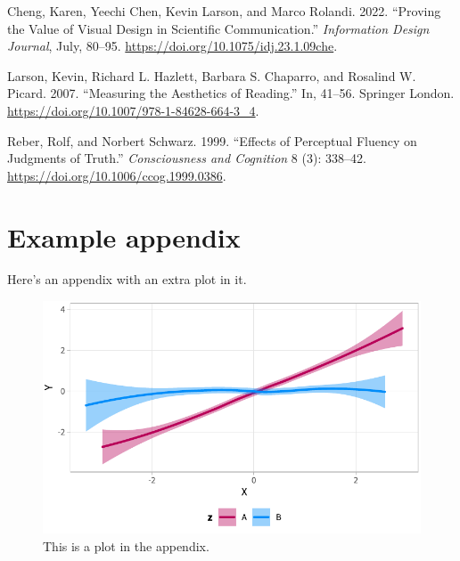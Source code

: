 \documentclass[
  a4paper,
  twoside]{article}
\newlength{\cslhangindent}
\newenvironment{CSLReferences}[2] %
 {\begin{list}{}{%
  \setlength{\itemindent}{0pt}
  \setlength{\leftmargin}{0pt}
  \setlength{\parsep}{0pt}
  \ifodd #1
   \setlength{\leftmargin}{\cslhangindent}
   \setlength{\itemindent}{-1\cslhangindent}
  \fi
  \setlength{\itemsep}{#2\baselineskip}}}
 {\end{list}}
\begin{document}
\label{refs}
\begin{CSLReferences}{1}{0}
Cheng, Karen, Yeechi Chen, Kevin Larson, and Marco Rolandi. 2022. {``Proving the Value of Visual Design in Scientific Communication.''} \emph{Information Design Journal}, July, 80--95. \url{https://doi.org/10.1075/idj.23.1.09che}.

Larson, Kevin, Richard L. Hazlett, Barbara S. Chaparro, and Rosalind W. Picard. 2007. {``Measuring the Aesthetics of Reading.''} In, 41--56. Springer London. \url{https://doi.org/10.1007/978-1-84628-664-3_4}.

Reber, Rolf, and Norbert Schwarz. 1999. {``Effects of Perceptual Fluency on Judgments of Truth.''} \emph{Consciousness and Cognition} 8 (3): 338--42. \url{https://doi.org/10.1006/ccog.1999.0386}.

\end{CSLReferences}

\appendix

\section{Example appendix}\label{appendixOne}

Here's an appendix with an extra plot in it.

\begin{figure}[H]

{\centering \includegraphics[width=\linewidth,]{chrisdoc_example_files/figure-latex/appendixplot-1} 

}

\caption{This is a plot in the appendix.}\label{fig:appendixplot}
\end{figure}
\end{document}
